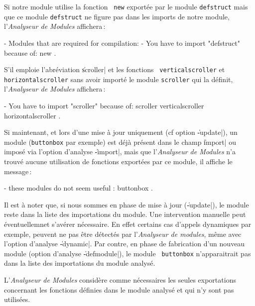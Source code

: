 Si notre module utilise la fonction \LeLisp\ {\tt new} export\'{e}e par
le module {\tt defstruct} mais que ce module {\tt defstruct} ne figure
pas dans les imports de notre module, l'{\em Analyseur de Modules} affichera\,:

\begin{Longcode*}
- Modules that are required for compilation:
- You have to import "defstruct" because of:
 new .
\end{Longcode*}

S'il emploie l'abr\'{e}viation \|{scroller}| et les fonctions {\tt
verticalscroller} et {\tt horizontalscroller} sans avoir import\'{e} le
module {\tt scroller} qui la d\'{e}finit, l'{\em Analyseur de Modules}
affichera\,: 

\begin{Longcode*}
- You have to import "scroller" because of:
 scroller verticalscroller horizontalscroller .
\end{Longcode*}


Si maintenant, et lors d'une mise \`{a} jour uniquement (cf option
\|-update|), un module ({\tt buttonbox} par exemple) 
est d\'{e}j\`{a} pr\'{e}sent dans le
champ \|import| ou impos\'{e} via l'option d'analyse \|-import|, mais
que l'{\em Analyseur de Modules} n'a trouv\'{e} 
aucune utilisation de fonctions 
export\'{e}es par ce module, il affiche le message\,:

\begin{Longcode*}
- these modules do not seem useful :
 buttonbox .
\end{Longcode*}

Il est \`{a} noter que, si nous sommes en phase de mise \`{a} jour
(\|-update|), le module reste dans la liste des importations du 
module. Une intervention manuelle peut \'{e}ventuellemnet s'av\'{e}rer
n\'{e}cessaire. En effet certains cas d'appels dynamiques par exemple,
peuvent ne pas \^{e}tre d\'{e}tect\'{e}s par l'{\em Analyseur de modules},
m\^{e}me avec l'option d'analyse \|-dynamic|. Par contre, en 
phase de fabrication d'un nouveau module (option d'analyse
\|-defmodule|), le module {\tt 
buttonbox} n'apparaitrait pas dans la liste des importations du module
analys\'{e}. 


L'{\em Analyseur de Modules} consid\`{e}re comme n\'{e}cessaires 
les seules exportations concernant les 
fonctions d\'{e}finies dans le module analys\'{e} et qui n'y sont pas
utilis\'{e}es.

